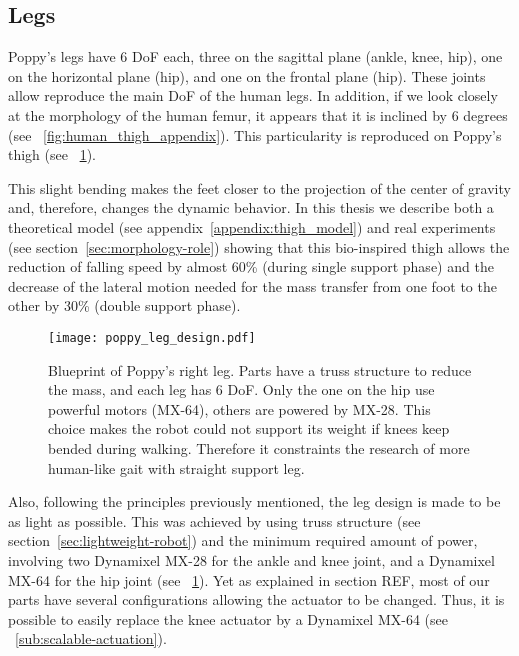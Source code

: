 \subsection{Legs} %
\label{sub:poppy-leg-design}

Poppy's legs have 6 DoF each, three on the sagittal plane (ankle, knee, hip), one on the horizontal plane (hip), and one on the frontal plane (hip). These joints allow reproduce the main DoF of the human legs. In addition, if we look closely at the morphology of the human femur, it appears that it is inclined by 6 degrees (see \figurename~\ref{fig:human_thigh_appendix}). This particularity is reproduced on Poppy's thigh (see \figurename~\ref{fig:poppy_leg_design}).



This slight bending makes the feet closer to the projection of the center of gravity and, therefore, changes the dynamic behavior.
In this thesis we describe both a theoretical model (see appendix~\ref{appendix:thigh_model}) and real experiments (see section~\ref{sec:morphology-role}) showing that this bio-inspired thigh allows the reduction of falling speed by almost 60\% (during single support phase) and the decrease of the lateral motion needed for the mass transfer from one foot to the other by 30\% (double support phase).


\begin{figure}[p]
    \centering
        \texttt{[image: poppy\_leg\_design.pdf]}
    \caption{Blueprint of Poppy's right leg. Parts have a truss structure to reduce the mass, and each leg has 6 DoF. Only the one on the hip use powerful motors (MX-64), others are powered by MX-28. This choice makes the robot could not support its weight if knees keep bended during walking. Therefore it constraints the research of more human-like gait with straight support leg.}
    \label{fig:poppy_leg_design}
\end{figure}


Also, following the principles previously mentioned, the leg design is made to be as light as possible. This was achieved by using truss structure (see section~\ref{sec:lightweight-robot}) and the minimum required amount of power, involving two Dynamixel MX-28 for the ankle and knee joint, and a Dynamixel MX-64 for the hip joint (see \figurename~\ref{fig:poppy_leg_design}). Yet as explained in section REF, most of our parts have several configurations allowing the actuator to be changed. Thus, it is possible to easily replace the knee actuator by a Dynamixel MX-64 (see \figurename~\ref{sub:scalable-actuation}).



